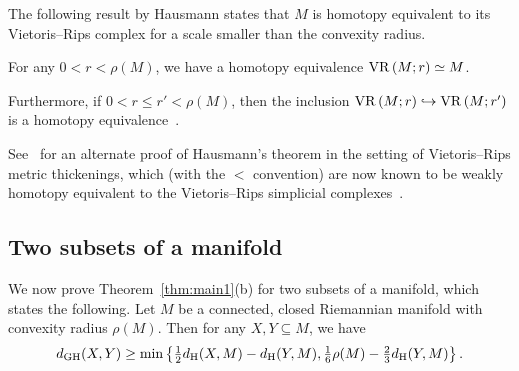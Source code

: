 \documentclass[11pt, reqno, english]{amsart}
\begin{document}
The following result by Hausmann states that $M$ is homotopy equivalent to its Vietoris--Rips complex for a scale smaller than the convexity radius.

\vspace{3mm}
\begin{theorem}
\label{thm:hausmann}
For any $0<r<\rho(M)$, we have a homotopy equivalence $\mathrm{VR}\left(M;r\right) \simeq M$.

Furthermore, if $0<r\le r'<\rho(M)$, then the inclusion $\mathrm{VR}\left(M;r\right)\hookrightarrow\mathrm{VR}\left(M;r'\right)$ is a homotopy equivalence~\cite{virk2021rips}.
\end{theorem}
\vspace{3mm}

See~\cite{AAF} for an alternate proof of Hausmann's theorem in the setting of Vietoris--Rips metric thickenings, which (with the $<$ convention) are now known to be weakly homotopy equivalent to the Vietoris--Rips simplicial complexes~\cite{gillespie2023vietoris,gillespie2022homological,HA-FF-ZV}.

\subsection*{Two subsets of a manifold}

We now prove Theorem~\ref{thm:main1}(b) for two subsets of a manifold, which states the following.
Let  $M$ be a connected, closed Riemannian manifold with convexity radius $\rho(M)$.
Then for any $X,Y\subseteq M$, we have
\[d_{\mathrm{GH}}(X,Y) \ge \min\left\{\tfrac{1}{2}d_{\mathrm{H}}(X,M)-d_{\mathrm{H}}(Y,M), \tfrac{1}{6}\rho(M)-\tfrac{2}{3}d_{\mathrm{H}}(Y,M)\right\}.\]
\end{document}

